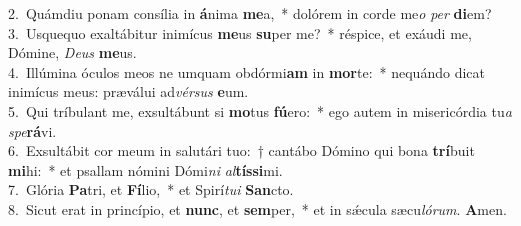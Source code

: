 {2.~}Quámdiu ponam consília in \textbf{á}nima \textbf{me}a,~* dolórem in corde me\textit{o} \textit{per} \textbf{di}em?\\
{3.~}Usquequo exaltábitur inimícus \textbf{me}us \textbf{su}per me?~* réspice, et exáudi me, Dómine, \textit{De}\textit{us} \textbf{me}us.\\
{4.~}Illúmina óculos meos ne umquam obdórmi\textbf{am} in \textbf{mor}te:~* nequándo dicat inimícus meus: præválui ad\textit{vér}\textit{sus} \textbf{e}um.\\
{5.~}Qui tríbulant me, exsultábunt si \textbf{mo}tus \textbf{fú}ero:~* ego autem in misericórdia tu\textit{a} \textit{spe}\textbf{rá}vi.\\
{6.~}Exsultábit cor meum in salutári tuo:~† cantábo Dómino qui bona \textbf{trí}buit \textbf{mi}hi:~* et psallam nómini Dómi\textit{ni} \textit{al}\textbf{tís}\textbf{si}mi.\\
{7.~}Glória \textbf{Pa}tri, et \textbf{Fí}lio,~* et Spirí\textit{tu}\textit{i} \textbf{San}cto.\\
{8.~}Sicut erat in princípio, et \textbf{nunc}, et \textbf{sem}per,~* et in sǽcula sæcu\textit{ló}\textit{rum}. \textbf{A}men.\\

